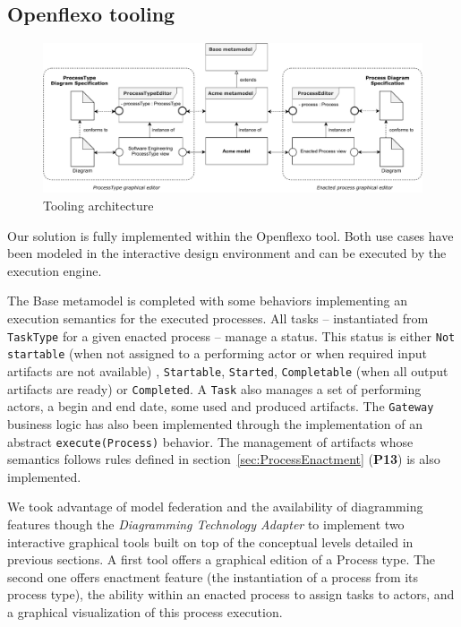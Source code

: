 \subsection{Openflexo tooling}
\label{subsec:tooling}

\begin{figure}
 \centering
     \includegraphics[width=0.9 \textwidth]{Figures/ToolingArchitecture.pdf}
     \caption{Tooling architecture}
    \label{fig:ToolingArchitecture}
\end{figure}

Our solution is fully implemented within the Openflexo tool. Both use cases have been modeled in the interactive design environment and can be executed by the \FML execution engine. 



The Base metamodel is completed with some behaviors implementing an execution semantics for the executed processes. All tasks -- instantiated from \texttt{TaskType} for a given enacted process -- manage a status. This status is either \texttt{Not startable} (when not assigned to a performing actor or when required input artifacts are not available) , \texttt{Startable}, \texttt{Started}, \texttt{Completable} (when all output artifacts are ready) or \texttt{Completed}. A \texttt{Task} also manages a set of performing actors, a begin and end date, some used and produced artifacts. The \texttt{Gateway} business logic has also been implemented through the implementation of an abstract \texttt{execute(Process)} behavior. The management of artifacts whose semantics follows rules defined in section~\ref{sec:ProcessEnactment} (\textbf{P13}) is also implemented.



We took advantage of model federation and the availability of diagramming features though the \textit{Diagramming Technology Adapter} to implement two interactive graphical tools built on top of the conceptual levels detailed in previous sections. A first tool offers a graphical edition of a Process type. The second one offers enactment feature (the instantiation of a process from its process type), the ability within an enacted process to assign tasks to actors, and a graphical visualization of this process execution.



